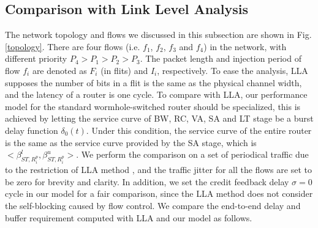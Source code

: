 \documentclass[preprint]{elsarticle}
\begin{document}
\subsection{Comparison with Link Level Analysis}\label{llacmp}
The network topology and flows we discussed in this subsection are shown in Fig. \ref{topology}. There are four flows (i.e. $f_1$, $f_2$, $f_3$ and $f_4$) in the network, with different priority $P_4>P_1>P_2>P_3$. The packet length and injection period of flow $f_i$ are denoted as $F_i$ (in flits) and $I_i$, respectively. To ease the analysis, LLA supposes the number of bits in a flit is the same as the physical channel width, and the latency of a router is one cycle. To compare with LLA, our performance model for the standard wormhole-switched router should be specialized, this is achieved by letting the service curve of BW, RC, VA, SA and LT stage be a burst delay function $\delta_0(t)$. Under this condition, the service curve of the entire router is the same as the service curve provided by the SA stage, which is $<\beta_{ST,R_i^p}^l,\beta_{ST,R_i^p}^u>$. We perform the comparison on a set of periodical traffic due to the restriction of LLA method \cite{73}\cite{189}, and the traffic jitter for all the flows are set to be zero for brevity and clarity. In addition, we set the credit feedback delay $\sigma=0$ cycle in our model for a fair comparison, since the LLA method does not consider the self-blocking caused by flow control. We compare the end-to-end delay and buffer requirement computed with LLA and our model as follows.
\end{document}
